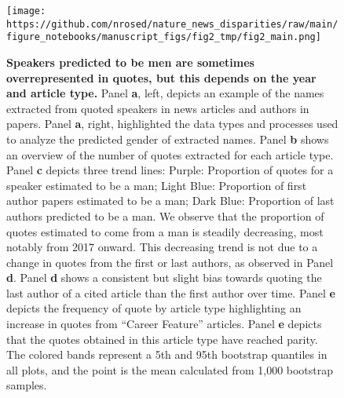 \begin{figure}
\hypertarget{fig:fig2}{%
\centering
\texttt{[image: https://github.com/nrosed/nature\_news\_disparities/raw/main/figure\_notebooks/manuscript\_figs/fig2\_tmp/fig2\_main.png]}
\caption{\textbf{Speakers predicted to be men are sometimes overrepresented in quotes, but this depends on the year and article type.}
Panel \textbf{a}, left, depicts an example of the names extracted from quoted speakers in news articles and authors in papers.
Panel \textbf{a}, right, highlighted the data types and processes used to analyze the predicted gender of extracted names.
Panel \textbf{b} shows an overview of the number of quotes extracted for each article type.
Panel \textbf{c} depicts three trend lines: Purple: Proportion of quotes for a speaker estimated to be a man; Light Blue: Proportion of first author papers estimated to be a man; Dark Blue: Proportion of last authors predicted to be a man.
We observe that the proportion of quotes estimated to come from a man is steadily decreasing, most notably from 2017 onward.
This decreasing trend is not due to a change in quotes from the first or last authors, as observed in Panel \textbf{d}.
Panel \textbf{d} shows a consistent but slight bias towards quoting the last author of a cited article than the first author over time.
Panel \textbf{e} depicts the frequency of quote by article type highlighting an increase in quotes from ``Career Feature'' articles.
Panel \textbf{e} depicts that the quotes obtained in this article type have reached parity.
The colored bands represent a 5th and 95th bootstrap quantiles in all plots, and the point is the mean calculated from 1,000 bootstrap samples.}\label{fig:fig2}
}
\end{figure}

